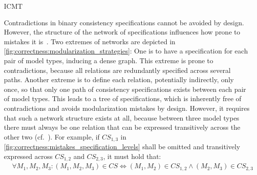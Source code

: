\begin{copiedFrom}{ICMT}

Contradictions in binary consistency specifications cannot be avoided by design.
However, the structure of the network of specifications influences how prone to mistakes it is~\cite{klare2018docsym}.
Two extremes of networks are depicted in \autoref{fig:correctness:modularization_strategies}:
One is to have a specification for each pair of model types, inducing a dense graph. %
This extreme is prone to contradictions, because all relations are redundantly specified across several paths.
Another extreme is to define each relation, potentially indirectly, only once, so that only one path of consistency specifications exists between each pair of model types.
This leads to a tree of specifications, which is inherently free of contradictions and %
avoids modularization mistakes by design.
However, it requires that such a network structure exists at all, because between three model types there must always be one relation that can be expressed transitively across the other two (cf.~\cite{klare2018docsym}).
For example, if $\mathit{CS}_{1,3}$ in \autoref{fig:correctness:mistakes_specification_levels} shall be omitted and transitively expressed across $\mathit{CS}_{1,2}$ and $\mathit{CS}_{2,3}$, it must hold that:
\begin{align*}
    & \forall M_1, M_2, M_3 : (M_1, M_2, M_3) \in \mathit{CS} \Leftrightarrow (M_1, M_2) \in \mathit{CS}_{1,2} \land (M_2, M_3) \in \mathit{CS}_{2,3}
\end{align*}


\end{copiedFrom}
